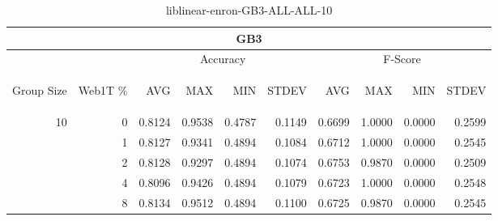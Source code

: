 \begin{center}
\begin{table}[htbp] 
 \begin{center}
\begin{tabular}{ | r | r | r | r | r | r | r | r | r | r |}
\hline
\multicolumn{10}{|c|}{GB3}\\
\hline
 & & \multicolumn{4}{|c|}{Accuracy} & \multicolumn{4}{|c|}{F-Score}\\ \cline{3-10}
\begin{sideways}Group Size\end{sideways} & \begin{sideways}Web1T \%\end{sideways} & \begin{sideways}AVG\end{sideways} & \begin{sideways}MAX\end{sideways} & \begin{sideways}MIN\end{sideways} & \begin{sideways}STDEV\end{sideways} & \begin{sideways}AVG\end{sideways} & \begin{sideways}MAX\end{sideways} & \begin{sideways}MIN\end{sideways} & \begin{sideways}STDEV\end{sideways}\\
\hline
\multirow{4}{*}{10}
 & 0 & 0.8124 & 0.9538 & 0.4787 & 0.1149 & 0.6699 & 1.0000 & 0.0000 & 0.2599\\ \cline{2-10}
 & 1 & 0.8127 & 0.9341 & 0.4894 & 0.1084 & 0.6712 & 1.0000 & 0.0000 & 0.2545\\ \cline{2-10}
 & 2 & 0.8128 & 0.9297 & 0.4894 & 0.1074 & 0.6753 & 0.9870 & 0.0000 & 0.2509\\ \cline{2-10}
 & 4 & 0.8096 & 0.9426 & 0.4894 & 0.1079 & 0.6723 & 1.0000 & 0.0000 & 0.2548\\ \cline{2-10}
 & 8 & 0.8134 & 0.9512 & 0.4894 & 0.1100 & 0.6725 & 0.9870 & 0.0000 & 0.2545\\ \cline{2-10}
\hline
\end{tabular}
\caption{liblinear-enron-GB3-ALL-ALL-10}
\label{table:liblinear-enron-GB3-ALL-ALL-10}
\end{center}
 \end{table}
\end{center}

